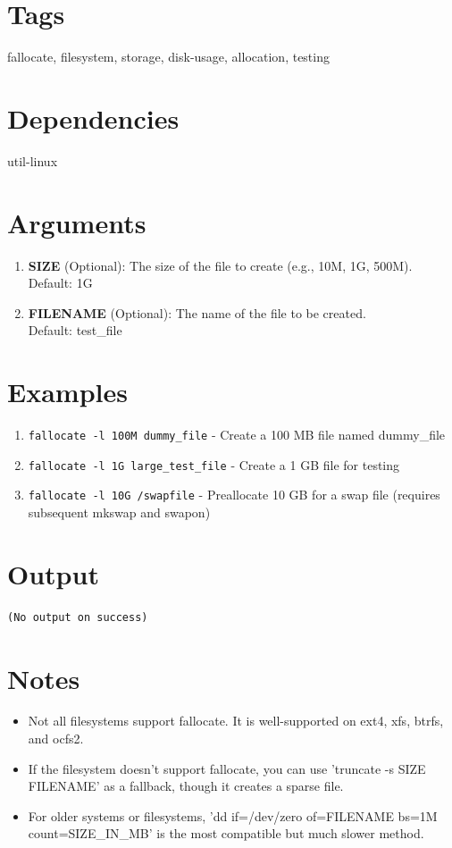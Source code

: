 \documentclass[openany]{book}
\begin{document}
\section*{Tags}
fallocate, filesystem, storage, disk-usage, allocation, testing

\section*{Dependencies}
util-linux


\section*{Arguments}
\begin{enumerate}
  \item \textbf{SIZE} (Optional): The size of the file to create (e.g., 10M, 1G, 500M). \\ Default: 1G
  \item \textbf{FILENAME} (Optional): The name of the file to be created. \\ Default: test\_file
\end{enumerate}

\section*{Examples}
\begin{enumerate}
  \item \texttt{fallocate -l 100M dummy\_file} - Create a 100 MB file named dummy\_file
  \item \texttt{fallocate -l 1G large\_test\_file} - Create a 1 GB file for testing
  \item \texttt{fallocate -l 10G /swapfile} - Preallocate 10 GB for a swap file (requires subsequent mkswap and swapon)
\end{enumerate}

\section*{Output}
\begin{lstlisting}
(No output on success)
\end{lstlisting}

\section*{Notes}
\begin{itemize}
  \item Not all filesystems support fallocate. It is well-supported on ext4, xfs, btrfs, and ocfs2.
  \item If the filesystem doesn't support fallocate, you can use 'truncate -s SIZE FILENAME' as a fallback, though it creates a sparse file.
  \item For older systems or filesystems, 'dd if=/dev/zero of=FILENAME bs=1M count=SIZE\_IN\_MB' is the most compatible but much slower method.
\end{itemize}
\end{document}
